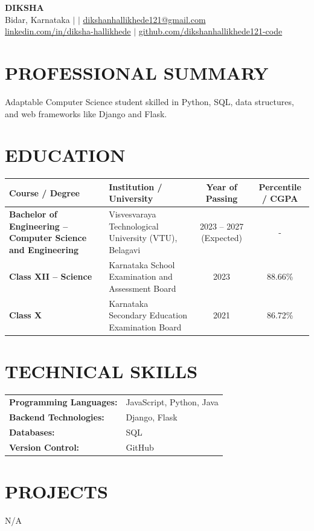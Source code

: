 \documentclass[9.5pt,a4paper]{extarticle}
\begin{document}
\begin{center}
{\Large \textbf{DIKSHA}} \\ \vspace{2pt}
Bidar, Karnataka \quad $|$  \quad $|$ \quad \href{mailto:dikshanhallikhede121@gmail.com}{dikshanhallikhede121@gmail.com} \\
\href{https://linkedin.com/in/diksha-hallikhede}{linkedin.com/in/diksha-hallikhede} \quad $|$ \quad \href{https://github.com/dikshanhallikhede121-code}{github.com/dikshanhallikhede121-code}
\end{center}

\section*{PROFESSIONAL SUMMARY}
Adaptable Computer Science student skilled in Python, SQL, data structures, and web frameworks like Django and Flask.

\section*{EDUCATION}
{\small
\renewcommand{\arraystretch}{1.18}
\noindent\begin{tabularx}{\textwidth}{|p{1.7in}|X|c|c|}
\hline
\textbf{Course / Degree} & \textbf{Institution / University} & \textbf{Year of Passing} & \textbf{Percentile / CGPA} \\ \hline
\textbf{Bachelor of Engineering – Computer Science and Engineering} & Visvesvaraya Technological University (VTU), Belagavi & 2023 – 2027 (Expected) & - \\ \hline
\textbf{Class XII – Science} & Karnataka School Examination and Assessment Board & 2023 & 88.66\% \\ \hline
\textbf{Class X} & Karnataka Secondary Education Examination Board & 2021 & 86.72\% \\ \hline
\end{tabularx}
}\vspace{4pt}


\section*{TECHNICAL SKILLS}
\begin{tabular}{@{}p{2.3in}p{4.6in}@{}}
\textbf{Programming Languages:} & JavaScript, Python, Java \\
\textbf{Backend Technologies:} & Django, Flask \\
\textbf{Databases:} & SQL \\
\textbf{Version Control:} & GitHub \\
\end{tabular}



\section*{PROJECTS}
N/A


\end{document}
